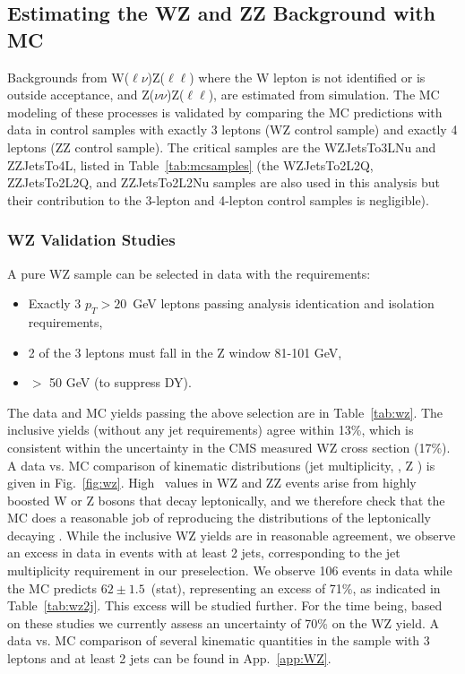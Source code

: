 \clearpage

\subsection{Estimating the WZ and ZZ Background with MC}
\label{sec:bkg_vz}

Backgrounds from W($\ell\nu$)Z($\ell\ell$) where the W lepton is not identified or is outside acceptance, and Z($\nu\nu$)Z($\ell\ell$),
are estimated from simulation. The MC modeling of these processes is validated by comparing the MC predictions with data in control samples
with exactly 3 leptons (WZ control sample) and exactly 4 leptons (ZZ control sample). 
The critical samples are the WZJetsTo3LNu and ZZJetsTo4L, listed in Table~\ref{tab:mcsamples}
(the WZJetsTo2L2Q, ZZJetsTo2L2Q, and ZZJetsTo2L2Nu samples are also used in this analysis but their contribution to the 3-lepton and 4-lepton
control samples is negligible).

\subsubsection{WZ Validation Studies}
\label{sec:bkg_wz}

A pure WZ sample can be selected in data with the requirements:

\begin{itemize}
\item Exactly 3 $p_T>20$~GeV leptons passing analysis identication and isolation requirements,
\item 2 of the 3 leptons must fall in the Z window 81-101 GeV,
\item \MET $>$ 50 GeV (to suppress DY).
\end{itemize}

The data and MC yields passing the above selection are in Table~\ref{tab:wz}. 
The inclusive yields (without any jet requirements) agree within 13\%, which is consistent within
the uncertainty in the CMS measured WZ cross section (17\%). A data vs. MC comparison of kinematic
distributions (jet multiplicity, \MET, Z \pt) is given in Fig.~\ref{fig:wz}. High \MET\ 
values in WZ and ZZ events arise from highly boosted W or Z bosons that decay leptonically, 
and we therefore check that the MC does a reasonable job of reproducing the \pt distributions of the 
leptonically decaying \Z. While the inclusive WZ yields are in reasonable agreement, we observe
an excess in data in events with at least 2 jets, corresponding to the jet multiplicity requirement
in our preselection. We observe 106 events in data while the MC predicts $62\pm1.5$~(stat), representing an excess of 71\%,
as indicated in Table~\ref{tab:wz2j}. 
This excess will be studied further. For the time being, based on these studies we currently assess an uncertainty of 70\% on the WZ yield.
A data vs. MC comparison of several kinematic quantities in the sample with 3 leptons and at least 2 jets can be found in App.~\ref{app:WZ}.

